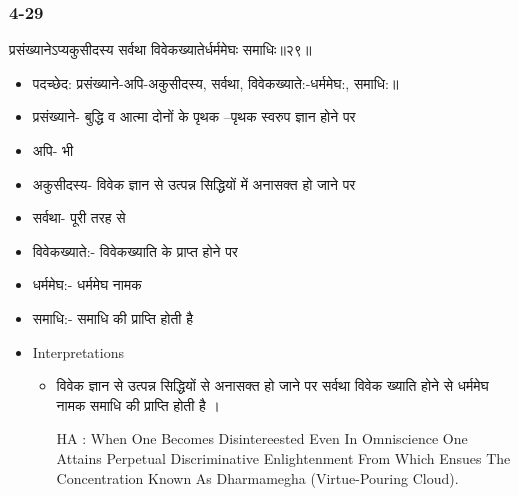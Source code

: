 \begin{frame}[fragile]\frametitle{4-29}
\begin{sanskrit}
प्रसंख्यानेऽप्यकुसीदस्य सर्वथा विवेकख्यातेर्धर्ममेघः समाधिः॥२९॥
\end{sanskrit}

	\begin{itemize}
	\item पदच्छेद:  ‌प्रसंख्याने-अपि-अकुसीदस्य, सर्वथा, विवेकख्याते:-धर्ममेघ:, समाधि:॥
	\item प्रसंख्याने- बुद्धि व आत्मा दोनों के पृथक –पृथक स्वरुप ज्ञान होने पर
	\item अपि- भी
	\item अकुसीदस्य- विवेक ज्ञान से उत्पन्न सिद्धियों में अनासक्त हो जाने पर
	\item सर्वथा- पूरी तरह से
	\item विवेकख्याते:- विवेकख्याति के प्राप्त होने पर
	\item धर्ममेघ:- धर्ममेघ नामक
	\item समाधि:- समाधि की प्राप्ति होती है	
	\item Interpretations
		\begin{itemize}	
		\item विवेक ज्ञान से उत्पन्न सिद्धियों से अनासक्त हो जाने पर सर्वथा विवेक ख्याति होने से धर्ममेघ नामक समाधि की प्राप्ति होती है ।
		\item [HA]: When One Becomes Disintereested Even In Omniscience One Attains Perpetual Discriminative Enlightenment From Which Ensues The Concentration Known As Dharmamegha (Virtue-Pouring Cloud).
		\end{itemize}
	\end{itemize}
\end{frame}

